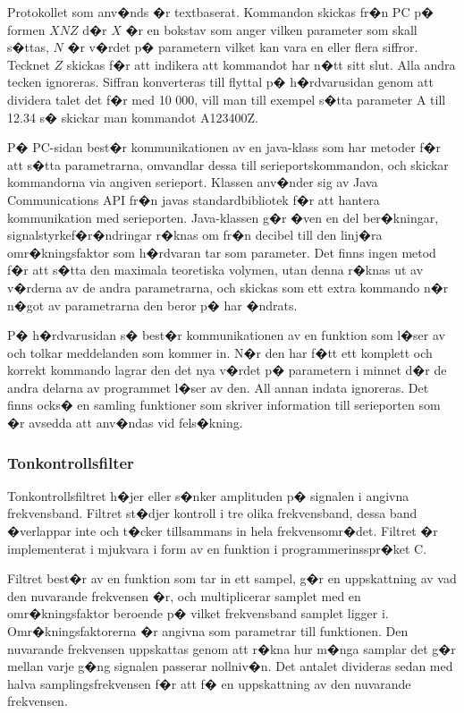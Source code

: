 \documentclass[a4paper]{article}
\begin{document}
Protokollet som anv�nds �r textbaserat. Kommandon skickas fr�n PC p� formen
$XNZ$ d�r $X$ �r en bokstav som anger vilken parameter som skall s�ttas, $N$ �r v�rdet
p� parametern vilket kan vara en eller flera siffror. Tecknet $Z$ skickas f�r 
att indikera att kommandot har n�tt sitt slut. Alla andra tecken ignoreras.
Siffran konverteras till flyttal p� h�rdvarusidan genom att dividera talet
det f�r med 10 000, vill man till exempel s�tta parameter A till 12.34 s� skickar man
kommandot A123400Z.

P� PC-sidan best�r kommunikationen av en java-klass som har metoder f�r att 
s�tta parametrarna, omvandlar dessa till serieportskommandon, och skickar
kommandorna via angiven serieport. Klassen anv�nder sig av Java Communications API
fr�n javas standardbibliotek f�r att hantera kommunikation med serieporten.
Java-klassen g�r �ven en del ber�kningar, signalstyrkef�r�ndringar r�knas om
fr�n decibel till den linj�ra omr�kningsfaktor som h�rdvaran tar som 
parameter. Det finns ingen metod f�r att s�tta den maximala teoretiska volymen,
utan denna r�knas ut av v�rderna av de andra parametrarna, och skickas som ett
extra kommando n�r n�got av parametrarna den beror p� har �ndrats.

P� h�rdvarusidan s� best�r kommunikationen av en funktion som l�ser av och 
tolkar meddelanden som kommer in. N�r den har f�tt ett komplett och korrekt
kommando lagrar den det nya v�rdet p� parametern i minnet d�r de andra delarna
av programmet l�ser av den. All annan indata ignoreras. Det finns ocks� en
samling funktioner som skriver information till serieporten som �r avsedda att 
anv�ndas vid fels�kning.


\subsubsection{Tonkontrollsfilter}

Tonkontrollsfiltret h�jer eller s�nker amplituden p� signalen i angivna
frekvensband. Filtret st�djer kontroll i tre olika frekvensband, dessa band
�verlappar inte och t�cker tillsammans in hela frekvensomr�det. Filtret �r
implementerat i mjukvara i form av en funktion i programmerinsspr�ket C.

Filtret best�r av en funktion som tar in ett sampel, g�r en uppskattning av
vad den nuvarande frekvensen �r, och multiplicerar samplet med en
omr�kningsfaktor beroende p� vilket frekvensband samplet ligger i.
Omr�kningsfaktorerna �r angivna som parametrar till funktionen. Den 
nuvarande frekvensen uppskattas genom att r�kna hur m�nga samplar det g�r 
mellan varje g�ng signalen passerar nollniv�n. Det antalet divideras sedan med 
halva samplingsfrekvensen f�r att f� en uppskattning av den nuvarande
frekvensen.
\end{document}
